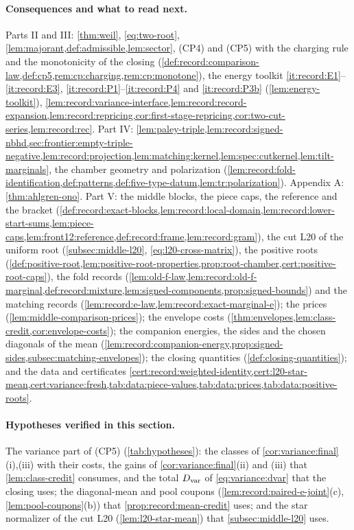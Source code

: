 \paragraph{Consequences and what to read next.}
Parts II and III: \cref{thm:weil}, \eqref{eq:two-root},
\cref{lem:majorant,def:admissible,lem:sector}, (CP4) and (CP5)
with the charging rule and the monotonicity of the closing
(\cref{def:record:comparison-law,def:cp5,rem:cp:charging,rem:cp:monotone}),
the energy toolkit \ref{it:record:E1}--\ref{it:record:E3},
\ref{it:record:P1}--\ref{it:record:P4} and \ref{it:record:P3b}
(\cref{lem:energy-toolkit}),
\cref{lem:record:variance-interface,lem:record:record-expansion,lem:record:repricing,cor:first-stage-repricing,cor:two-cut-series,lem:record:rec}.
Part IV:
\cref{lem:paley-triple,lem:record:signed-nbhd,sec:frontier:empty-triple-negative,lem:record:projection,lem:matching:kernel,lem:spec:cutkernel,lem:tilt-marginals},
the chamber geometry and polarization
(\cref{lem:record:fold-identification,def:patterns,def:five-type-datum,lem:tr:polarization}).
Appendix A: \cref{thm:ahlgren-ono}.
Part V: the middle blocks, the piece caps, the reference and the bracket
(\cref{def:record:exact-blocks,lem:record:local-domain,lem:record:lower-start-sums,lem:piece-caps,lem:front12:reference,def:record:frame,lem:record:gram}),
the cut L20 of the uniform root (\cref{subsec:middle-l20}, \eqref{eq:l20-cross-matrix}),
the positive roots
(\cref{def:positive-root,lem:positive-root-properties,prop:root-chamber,cert:positive-root-caps}),
the fold records (\cref{lem:old-f-law,lem:record:old-f-marginal,def:record:mixture,lem:signed-components,prop:signed-bounds})
and the matching records (\cref{lem:record:e-law,lem:record:exact-marginal-e}); the
prices (\cref{lem:middle-comparison-prices}); the envelope costs
(\cref{thm:envelopes,lem:class-credit,cor:envelope-costs}); the companion
energies, the sides and the chosen diagonals of the mean
(\cref{lem:record:companion-energy,prop:signed-sides,subsec:matching-envelopes}); the
closing quantities (\cref{def:closing-quantities}); and the data and certificates
\cref{cert:record:weighted-identity,cert:l20-star-mean,cert:variance:fresh,tab:data:piece-values,tab:data:prices,tab:data:positive-roots}.

\paragraph{Hypotheses verified in this section.}
The variance part of (CP5) (\cref{tab:hypotheses}): the classes of
\cref{cor:variance:final}(i),(iii) with their costs, the gains of
\cref{cor:variance:final}(ii) and (iii) that \cref{lem:class-credit} consumes, and
the total $D_{\rm var}$ of \eqref{eq:variance:dvar} that the closing uses; the
diagonal-mean and pool coupons (\cref{lem:record:paired-e-joint}(c),
\cref{lem:pool-coupons}(b)) that \cref{prop:record:mean-credit} uses; and the star
normalizer of the cut L20 (\cref{lem:l20-star-mean}) that
\cref{subsec:middle-l20} uses.
